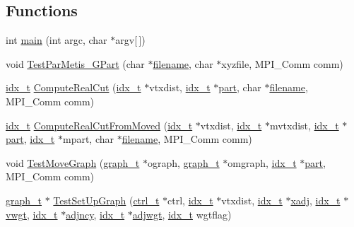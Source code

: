 \subsection*{Functions}
\begin{DoxyCompactItemize}
\item 
int \hyperlink{a00437_a0ddf1224851353fc92bfbff6f499fa97}{main} (int argc, char $\ast$argv\mbox{[}$\,$\mbox{]})
\item 
void \hyperlink{a00437_adb0c2dc0c5138f35c71739328c702074}{Test\+Par\+Metis\+\_\+\+G\+Part} (char $\ast$\hyperlink{a00623_a42a21beb8018ac623f4d09db1343b9cf}{filename}, char $\ast$xyzfile, M\+P\+I\+\_\+\+Comm comm)
\item 
\hyperlink{a00876_aaa5262be3e700770163401acb0150f52}{idx\+\_\+t} \hyperlink{a00437_a725d56a999dc467b3f7883eea465bab2}{Compute\+Real\+Cut} (\hyperlink{a00876_aaa5262be3e700770163401acb0150f52}{idx\+\_\+t} $\ast$vtxdist, \hyperlink{a00876_aaa5262be3e700770163401acb0150f52}{idx\+\_\+t} $\ast$\hyperlink{a00879_a0a9ea8670f88d6db1e021fee2dcd94be}{part}, char $\ast$\hyperlink{a00623_a42a21beb8018ac623f4d09db1343b9cf}{filename}, M\+P\+I\+\_\+\+Comm comm)
\item 
\hyperlink{a00876_aaa5262be3e700770163401acb0150f52}{idx\+\_\+t} \hyperlink{a00437_a8003a74d9258bf251cc16e3b964c4b69}{Compute\+Real\+Cut\+From\+Moved} (\hyperlink{a00876_aaa5262be3e700770163401acb0150f52}{idx\+\_\+t} $\ast$vtxdist, \hyperlink{a00876_aaa5262be3e700770163401acb0150f52}{idx\+\_\+t} $\ast$mvtxdist, \hyperlink{a00876_aaa5262be3e700770163401acb0150f52}{idx\+\_\+t} $\ast$\hyperlink{a00879_a0a9ea8670f88d6db1e021fee2dcd94be}{part}, \hyperlink{a00876_aaa5262be3e700770163401acb0150f52}{idx\+\_\+t} $\ast$mpart, char $\ast$\hyperlink{a00623_a42a21beb8018ac623f4d09db1343b9cf}{filename}, M\+P\+I\+\_\+\+Comm comm)
\item 
void \hyperlink{a00437_a136ad3b21ef4f877c3100a997814e8ce}{Test\+Move\+Graph} (\hyperlink{a00734}{graph\+\_\+t} $\ast$ograph, \hyperlink{a00734}{graph\+\_\+t} $\ast$omgraph, \hyperlink{a00876_aaa5262be3e700770163401acb0150f52}{idx\+\_\+t} $\ast$\hyperlink{a00879_a0a9ea8670f88d6db1e021fee2dcd94be}{part}, M\+P\+I\+\_\+\+Comm comm)
\item 
\hyperlink{a00734}{graph\+\_\+t} $\ast$ \hyperlink{a00437_aff9e935a0b03f0424e9c241573bb437b}{Test\+Set\+Up\+Graph} (\hyperlink{a00742}{ctrl\+\_\+t} $\ast$ctrl, \hyperlink{a00876_aaa5262be3e700770163401acb0150f52}{idx\+\_\+t} $\ast$vtxdist, \hyperlink{a00876_aaa5262be3e700770163401acb0150f52}{idx\+\_\+t} $\ast$\hyperlink{a00879_aa8fc7f75458e38e1e2979ed6db639164}{xadj}, \hyperlink{a00876_aaa5262be3e700770163401acb0150f52}{idx\+\_\+t} $\ast$\hyperlink{a00879_a34203f1160d94eca83e95f2718ea3504}{vwgt}, \hyperlink{a00876_aaa5262be3e700770163401acb0150f52}{idx\+\_\+t} $\ast$\hyperlink{a00879_a20c068e3ebdd8f9889fb82c1f677d679}{adjncy}, \hyperlink{a00876_aaa5262be3e700770163401acb0150f52}{idx\+\_\+t} $\ast$\hyperlink{a00879_a2be4719baa820cfa5c06fd070796e0d3}{adjwgt}, \hyperlink{a00876_aaa5262be3e700770163401acb0150f52}{idx\+\_\+t} wgtflag)
\end{DoxyCompactItemize}


